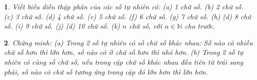 \documentclass{article}
\newtheorem{baitoan}{}
\begin{document}
\begin{baitoan}
	Viết biễu diễn thập phân của các số tự nhiên có: (a) 1 chữ số. (b) 2 chữ số. (c) 3 chữ số. (d) 4 chữ số. (e) 5 chữ số. (f) 6 chữ số. (g) 7 chữ số. (h) (d) 8 chữ số. (i) 9 chữ số. (j) (d) 10 chữ số. (k) $n$ chữ số, với $n\in\mathbb{N}$ cho trước. 
\end{baitoan}

\begin{baitoan}
	Chứng minh: (a) Trong 2 số tự nhiên có số chữ số khác nhau: Số nào có nhiều chữ số hơn thì lớn hơn, số nào có ít chữ số hơn thì nhỏ hơn. (b) Trong 2 số tự nhiên có cùng số chữ số, nếu trong cặp chữ số khác nhau đầu tiên từ trái sang phải, số nào có chữ số tương ứng trong cặp đó lớn hơn thì lớn hơn.
\end{baitoan}


\printbibliography[heading=bibintoc]
	
\end{document}
